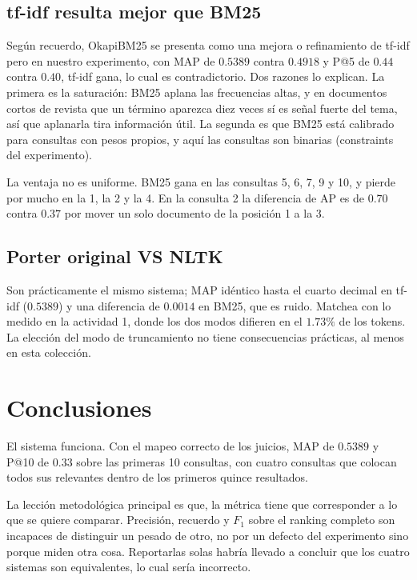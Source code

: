 \documentclass[11pt,letterpaper]{article}
\begin{document}
\subsection*{tf-idf resulta mejor que BM25}

Según recuerdo, OkapiBM25 se presenta como una mejora o refinamiento de 
tf-idf pero en nuestro experimento, con MAP de $0.5389$ contra $0.4918$ y
 P@5 de $0.44$ contra $0.40$,
tf-idf gana, lo cual es contradictorio. 
Dos razones lo explican. La primera es la saturación:
BM25 aplana las frecuencias altas, y en documentos cortos de revista
que un término aparezca diez veces sí es señal fuerte del tema, así
que aplanarla tira información útil. La segunda es que BM25 está
calibrado para consultas con pesos propios, y aquí las consultas son
binarias (constraints del experimento).

La ventaja no es uniforme. BM25 gana en las consultas 5, 6, 7, 9 y 10,
y pierde por mucho en la 1, la 2 y la 4. En la consulta 2 la
diferencia de AP es de $0.70$ contra $0.37$ por mover un solo
documento de la posición 1 a la 3.

\subsection*{Porter original VS NLTK}

Son prácticamente el mismo sistema; MAP idéntico hasta el cuarto
decimal en tf-idf ($0.5389$) y una diferencia de $0.0014$ en BM25, que
es ruido. Matchea con lo medido en la actividad 1, donde los dos
modos difieren en el $1.73\%$ de los tokens. La elección del modo de
truncamiento no tiene consecuencias prácticas, al menos en esta colección.


\section{Conclusiones}

El sistema funciona. Con el mapeo correcto de los juicios, MAP de
$0.5389$ y P@10 de $0.33$ sobre las primeras 10 consultas, con cuatro
consultas que colocan todos sus relevantes dentro de los primeros
quince resultados.

La lección metodológica principal es que, la métrica tiene que
corresponder a lo que se quiere comparar. Precisión, recuerdo y $F_1$
sobre el ranking completo son incapaces de distinguir un pesado de
otro, no por un defecto del experimento sino porque miden otra cosa.
Reportarlas solas habría llevado a concluir que los cuatro sistemas
son equivalentes, lo cual sería incorrecto.
\end{document}
